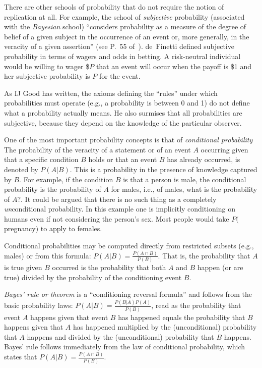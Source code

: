 There are other schools of probability that do not
require the notion of replication at all.  For example, the school of
\emph{subjective} probability (associated with the \emph{Bayesian}
school) ``considers probability as a measure of the degree of belief
of a given subject in the occurrence of an event or, more generally,
in the veracity of a given assertion'' (see P.\ 55 of~\cite{enc9}).
de~Finetti defined subjective probability in terms of wagers and odds
in betting.  A risk-neutral individual would be willing to wager \$$P$
that an event will occur when the payoff is \$1 and her subjective
probability is $P$ for the event.


As IJ Good has written, the axioms defining the ``rules'' under which probabilities
must operate (e.g., a probability is between 0 and 1) do not define
what a probability actually means.  He also surmises that all
probabilities are subjective, because they depend on the knowledge of
the particular observer.

One of the most important probability concepts is that of 
\emph{conditional probability}  The probability of the veracity of a statement 
or of an event $A$ occurring given that a specific condition $B$ holds or that an event 
$B$ has already occurred, is denoted by $P(A|B)$.  This is a probability in the 
presence of knowledge captured by $B$.  For example, if the condition $B$ is 
that a person is male, the conditional probability is the probability of $A$ 
for males, i.e., of males, what is the probability of $A$?.  It could
be argued that there is no such thing as a completely  
\emph{un}conditional probability.  In this example one is implicitly 
conditioning on humans even if not considering the person's sex.  Most
people would take $P($pregnancy$)$ to apply to females.

Conditional probabilities may be computed directly from restricted
subsets (e.g., males) or from this formula: $P(A|B)= \frac{P(A \cap
  B)}{P(B)}$.  That is, the probability that $A$ is true given $B$
occurred is the probability that both $A$ and $B$ happen (or are true)
divided by the probability of the conditioning event $B$.

\emph{Bayes' rule or theorem} is a ``conditioning reversal formula''
and follows from the basic probability laws:  $P(A | B) = \frac{P(B | A)
P(A)}{P(B)}$, read as the probability that event $A$ happens given
that event $B$ has happened equals the probability that $B$ happens
given that $A$ has happened multiplied by the (unconditional)
probability that $A$ happens and divided by the (unconditional)
probability that $B$ happens.  Bayes' rule follows immediately from
the law of conditional probability, which states that $P(A | B) =
\frac{P(A \cap B)}{P(B)}$.


